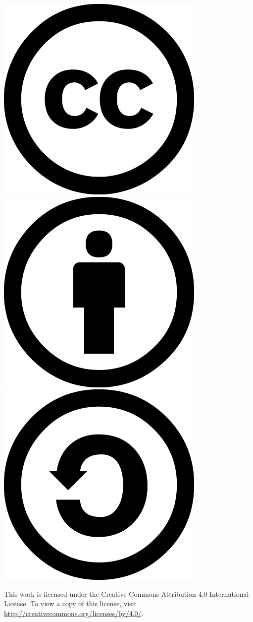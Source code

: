 \documentclass[a4paper,10pt]{report}
\begin{document}
\begin{center}
 \includegraphics[scale=0.25]{images/cclarge.png}
 \includegraphics[scale=0.25]{images/bylarge.png}
 \includegraphics[scale=0.25]{images/salarge.png}


\end{center}


This work is licensed under the Creative Commons Attribution 4.0 International License. To view a copy of this license, visit \url{http://creativecommons.org/licenses/by/4.0/}.




\end{document}
